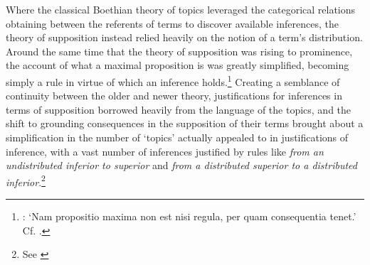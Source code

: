 \documentclass[a4paper, 11pt]{article}
\begin{document}

Where the classical Boethian theory of topics leveraged the categorical relations obtaining between the referents of terms to discover available inferences, the theory of supposition instead relied heavily on the notion of a term's distribution. Around the same time that the theory of supposition was rising to prominence,  the account of what a maximal proposition is was greatly simplified, becoming simply a rule in virtue of which an inference holds.\footnote{\autocite[76.5-7]{BurleyDPAL}: `Nam propositio maxima non est nisi regula, per quam consequentia tenet.' Cf. \autocite[31.3-6]{OckhamEL}.} Creating a semblance of continuity between the older and newer theory, justifications for inferences in terms of supposition borrowed heavily from the language of the topics, and the shift to grounding consequences in the supposition of their terms brought about a simplification in the number of `topics' actually appealed to in justifications of inference, with a vast number of inferences justified by rules like \emph{from an undistributed inferior to superior} and \emph{from a distributed superior to a distributed inferior}.\footnote{See \autocite[\textit{passim}]{Green-Pedersen1980a}} 
\end{document}
